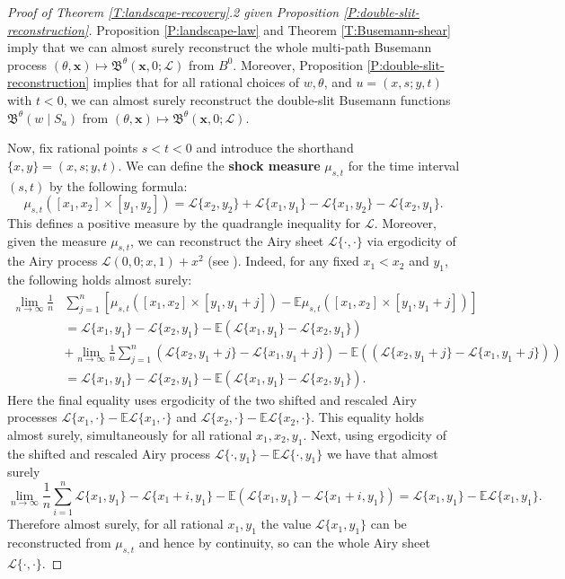 \documentclass[11pt]{article}
\newcommand{\E}{\mathbb{E}}
\newcommand{\cL}{\mathcal{L}}
\newcommand{\fB}{\mathfrak{B}}
\newcommand{\X}{\times}
\newcommand{\bx}{\mathbf{x}}
\theoremstyle{definition} %
\theoremstyle{remark} %
\begin{document}
\begin{proof}[Proof of Theorem \ref{T:landscape-recovery}.2 given Proposition \ref{P:double-slit-reconstruction}]
Proposition \ref{P:landscape-law} and Theorem \ref{T:Busemann-shear} imply that we can almost surely reconstruct the whole multi-path Busemann process $(\theta, \bx) \mapsto \fB^\theta(\bx, 0; \cL)$ from $B^0$. Moreover, Proposition \ref{P:double-slit-reconstruction} implies that for all rational choices of $w, \theta$, and $u = (x, s; y, t)$ with $t < 0$, we can almost surely reconstruct the double-slit Busemann functions $\mathfrak B^\theta(w \mid S_u)$ from $(\theta, \bx) \mapsto \fB^\theta(\bx, 0; \cL)$. 
	
	Now, fix rational points $s < t < 0$ and introduce the shorthand $\{x, y\} = (x, s; y, t)$. We can define the \textbf{shock measure} $\mu_{s, t}$ for the time interval $(s, t)$ by the following formula:
	\begin{equation}
		\label{E:shock-measure}
		\mu_{s, t}([x_1, x_2] \X [y_1, y_2]) = \cL\{x_2, y_2\} + \cL\{x_1, y_1\} - \cL\{x_1, y_2\} - \cL\{x_2, y_1\}. 
	\end{equation}
	This defines a positive measure by the quadrangle inequality for $\cL$. Moreover, given the measure $\mu_{s, t}$, we can reconstruct the Airy sheet $\cL\{\cdot, \cdot\}$ via ergodicity of the Airy process $\cL(0,0; x, 1) + x^2$ (see \cite[Section 5]{prahofer2002scale}). Indeed, for any fixed $x_1 < x_2$ and $y_1$, the following holds almost surely:
	\begin{align*}
		\lim_{n \to \infty} \frac{1}{n} &\sum_{j=1}^n [\mu_{s, t}([x_1, x_2] \X [y_1, y_1 +j]) - \E \mu_{s, t}([x_1, x_2] \X [y_1, y_1 +j])] \\
		&= \cL\{x_1, y_1\} - \cL\{x_2, y_1\} - \E (\cL\{x_1, y_1\} - \cL\{x_2, y_1\})  \\
		&+ \lim_{n \to \infty} \frac{1}{n} \sum_{j=1}^n (\cL\{x_2, y_1 + j\} - \cL\{x_1, y_1 + j\}) - \E ((\cL\{x_2, y_1 + j\} - \cL\{x_1, y_1 + j\})) \\
		&= \cL\{x_1, y_1\} - \cL\{x_2, y_1\} - \E (\cL\{x_1, y_1\} - \cL\{x_2, y_1\}).
	\end{align*}
	Here the final equality uses ergodicity of the two shifted and rescaled Airy processes $\cL\{x_1, \cdot \} - \E \cL\{x_1, \cdot\}$ and $\cL\{x_2, \cdot \} - \E \cL\{x_2, \cdot\}$. This equality holds almost surely, simultaneously for all rational $x_1, x_2, y_1$. Next, using ergodicity of the shifted and rescaled Airy process $\cL\{\cdot, y_1\} - \E \cL\{\cdot, y_1\}$ we have that almost surely
	$$
	\lim_{n \to \infty} \frac{1}n \sum_{i=1}^n \cL\{x_1, y_1\} - \cL\{x_1 + i, y_1\} - \E(\cL\{x_1, y_1\} - \cL\{x_1 + i, y_1\}) = \cL\{x_1, y_1\} - \E \cL\{x_1, y_1\}.
	$$
	Therefore almost surely, for all rational $x_1, y_1$ the value $\cL\{x_1, y_1\}$ can be reconstructed from $\mu_{s, t}$ and hence by continuity, so can the whole Airy sheet $\cL\{\cdot, \cdot\}$. 
	

\end{proof}
\end{document}
